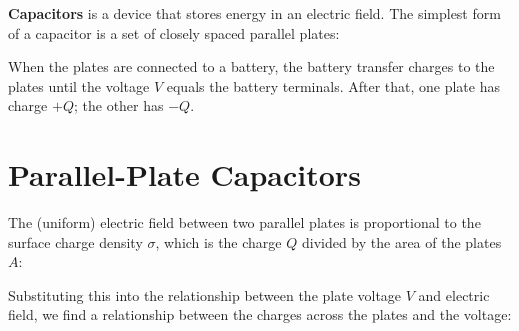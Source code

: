 %      
%
%
%
%
%
%
\textbf{Capacitors} is a device that stores energy in an electric field. The
simplest form of a capacitor is a set of closely spaced parallel plates:

When the plates are connected to a battery, the battery transfer charges to the
plates until the voltage $V$ equals the battery terminals. After that, one
plate has charge $+Q$; the other has $-Q$.


\section{Parallel-Plate Capacitors}
The (uniform) electric field between two parallel plates is proportional to the
surface charge density $\sigma$, which is the charge $Q$ divided by the area of
the plates $A$:

  
Substituting this into the relationship between the plate voltage $V$ and
electric field, we find a relationship between the charges across the plates
and the voltage:

